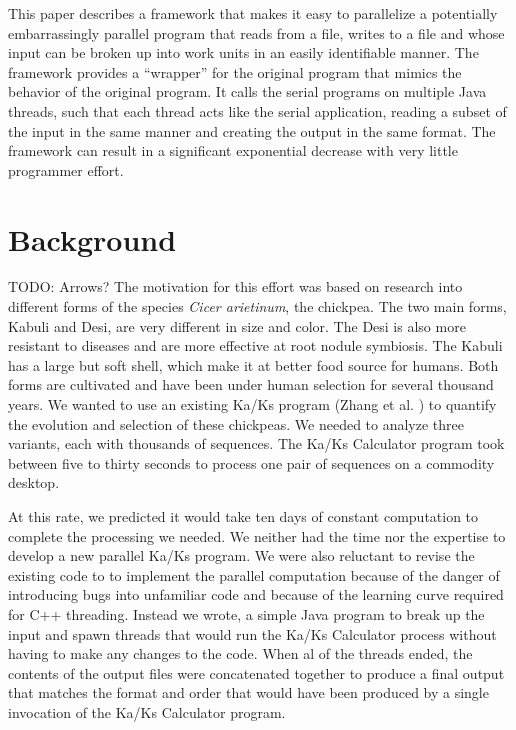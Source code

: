 \documentclass[12pt]{article}
\begin{document}
This paper describes a framework that makes it easy to parallelize a potentially
embarrassingly parallel program that reads from a file, writes to a file and
whose input can be broken up into work units in an easily identifiable manner.
The framework provides a ``wrapper'' for the original program that mimics the
behavior of the original program. It calls the serial programs on multiple Java
threads, such that each thread acts like the serial application, reading a
subset of the input in the same manner and creating the output in the same
format. The framework can result in a significant exponential decrease with very
little programmer effort. 

\section{Background}

TODO: Arrows?
The motivation for this effort was based on research into different forms of the
species \emph{Cicer arietinum}, the chickpea. The two main forms, Kabuli and
Desi, are very different in size and color. The Desi is also more resistant to
diseases and are more effective at root nodule symbiosis. The Kabuli has a large
but soft shell, which make it at better food source for humans. Both forms are
cultivated and have been under human selection for several thousand years. We
wanted to use an existing Ka/Ks program (Zhang et al. \cite{kaks}) to quantify
the evolution and selection of these chickpeas. We needed to analyze three
variants, each with thousands of sequences. The Ka/Ks Calculator program took
between five to thirty seconds to process one pair of sequences on a commodity
desktop.

At this rate, we predicted it would take ten days of constant computation to
complete the processing we needed. We neither had the time nor the expertise to
develop a new parallel Ka/Ks program. We were also reluctant to revise the
existing code to to implement the parallel computation because of the danger of
introducing bugs into unfamiliar code and because of the learning curve required
for C++ threading. Instead we wrote, a simple Java program to break up the input
and spawn threads that would run the Ka/Ks Calculator process without having to
make any changes to the code. When al of the threads ended, the contents of the
output files were concatenated together to produce a final output that matches
the format and order that would have been produced by a single invocation of the
Ka/Ks Calculator program.
\end{document}
